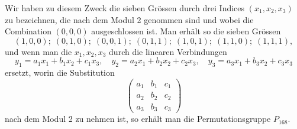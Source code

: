 \documentclass[12pt,a4paper]{article}
\begin{document}
Wir haben zu diesem Zweck die sieben Gr\"ossen durch drei Indices $(x_1, x_2, x_3)$ zu bezeichnen, die nach dem Modul 2 genommen sind und wobei die Combination $(0, 0, 0)$ ausgeschlossen ist. Man erh\"alt so die sieben Gr\"ossen
\begin{equation}
\label{eq:sieben} (1, 0, 0); \; (0, 1, 0); \; (0, 0, 1); \; (0, 1, 1); \; (1, 0, 1); \; (1, 1, 0); \; (1, 1, 1),
\end{equation}
und wenn man die $x_1, x_2, x_3$ durch die linearen Verbindungen
\begin{equation}
\label{eq:linverb} y_1 = a_1 x_1 + b_1 x_2 + c_1 x_3, \quad y_2 = a_2 x_1 + b_2 x_2 + c_2 x_3, \quad y_3 = a_3 x_1 + b_3 x_2 + c_3 x_3
\end{equation}
ersetzt, worin die Substitution
\begin{equation}
\label{eq:substmod2} \begin{pmatrix} a_1 & b_1 & c_1 \\ a_2 & b_2 & c_2 \\ a_3 & b_3 & c_3 \end{pmatrix}
\end{equation}
nach dem Modul 2 zu nehmen ist, so erh\"alt man die Permutationsgruppe $P_{168}$.
\end{document}
